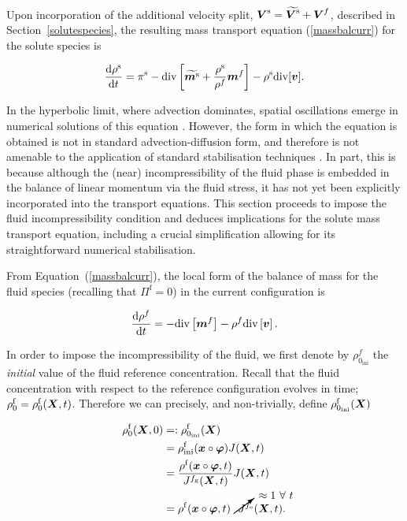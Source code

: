 Upon incorporation of the additional velocity split,
$\mbox{\boldmath$ V$}^\mathrm{s}=\widetilde{\mbox{\boldmath$ V$}^\mathrm{s}}+\mbox{\boldmath$ V$}^f$, described in
Section~\ref{solutespecies}, the resulting mass transport equation
(\ref{massbalcurr}) for the solute species is

\begin{equation}
\frac{\mathrm{d}\rho^\mathrm{s}}{\mathrm{d}t} = \pi^\mathrm{s}-
\mathrm{div} \left[\widetilde{\mbox{\boldmath$ m$}^\mathrm{s}}+
\frac{\rho^\mathrm{s}}{\rho^f}\mbox{\boldmath$ m$}^f\right] - \rho^\mathrm{s}
\mathrm{div}[\mbox{\boldmath$ v$}].
\label{massbalcurrsol}
\end{equation}

\noindent In the hyperbolic limit, where advection dominates, spatial
oscillations emerge in numerical solutions of this equation
\citep{Brooks:82,Paper6}. However, the form in which the equation is
obtained is not in standard advection-diffusion form, and therefore is
not amenable to the application of standard stabilisation techniques
\citep{Paper6}. In part, this is because although the (near)
incompressibility of the fluid phase is embedded in the balance of
linear momentum via the fluid stress, it has not yet been explicitly
incorporated into the transport equations. This section proceeds to
impose the fluid incompressibility condition and deduces implications
for the solute mass transport equation, including a crucial
simplification allowing for its straightforward numerical
stabilisation.

From \mbox{Equation (\ref{massbalcurr})}, the local form of the
balance of mass for the fluid species (recalling that
$\Pi^\mathrm{f}=0$) in the current configuration is

\begin{equation}
\frac{\mathrm{d}\rho^f}{\mathrm{d}t} = - \mathrm{div}\left[\mbox{\boldmath$ m$}^f\right]
- \rho^f \mathrm{div}\left[\mbox{\boldmath$ v$}\right].
\label{fluidtransporteqn}
\end{equation}

\noindent In order to impose the incompressibility of the fluid, we
first denote by $\rho_{0_{\mathrm{ini}}}^{f}$ the {\sl initial} value
of the fluid reference concentration. Recall that the fluid
concentration with respect to the reference configuration evolves in
time; $\rho^\mathrm{f}_0 = \rho^\mathrm{f}_0(\mbox{\boldmath$ X$},t)$. Therefore we can
precisely, and non-trivially, define
$\rho_{0_{\mathrm{ini}}}^{\mathrm{f}}(\mbox{\boldmath$ X$})$   

\begin{equation}
\begin{split}
\rho_{0}^{\mathrm{f}}(\bX,0)
                   &=:\rho_{0_{\mathrm{ini}}}^{\mathrm{f}}(\bX)\\ 
                   &=\rho_{\mathrm{ini}}^{\mathrm{f}}(\bx\circ\Bvarphi)
                   J(\bX, t)\\ &=\frac{\rho^{\mathrm{f}}
                   (\bx\circ\Bvarphi,t)} {J^{f_\mathrm{g}}(\bX,t)}
                   J(\bX,t)\\ &=\rho^{\mathrm{f}} (\bx\circ\Bvarphi,t)
                   \cancelto{\approx 1\ \forall\ t}
                   {J^{f_\mathrm{e}}}(\bX,t).\\
\label{incompderiv}
\end{split}
\end{equation}

